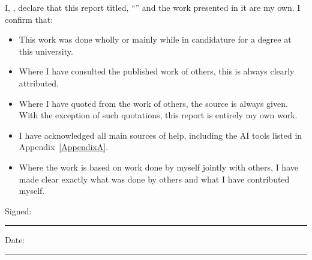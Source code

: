 \documentclass[
11pt,
russian, %
english, %
singlespacing,
liststotoc,
headsepline,
]{MastersDoctoralThesis}
\begin{document}
\begin{declaration}
\addchaptertocentry{\authorshipname}
\noindent I, \authorname, declare that this report titled, \enquote{\ttitle} and the work presented in it are my own. I confirm that:

\begin{itemize}
\item This work was done wholly or mainly while in candidature for a degree at this university.
\item Where I have consulted the published work of others, this is always clearly attributed.
\item Where I have quoted from the work of others, the source is always given. With the exception of such quotations, this report is entirely my own work.
\item I have acknowledged all main sources of help, including the AI tools listed in Appendix~\ref{AppendixA}.
\item Where the work is based on work done by myself jointly with others, I have made clear exactly what was done by others and what I have contributed myself.\\
\end{itemize}

\noindent Signed:\\
\rule[0.5em]{25em}{0.5pt}

\noindent Date:\\
\rule[0.5em]{25em}{0.5pt}
\end{declaration}

\cleardoublepage


\begin{abstract}
\addchaptertocentry{\abstractname}

\end{abstract}

\begin{extraAbstract}
\begin{otherlanguage}{russian}

\end{otherlanguage}
\end{extraAbstract}

\begin{extraAbstract}
\begin{otherlanguage}{russian}

\end{otherlanguage}
\end{extraAbstract}
\end{document}

